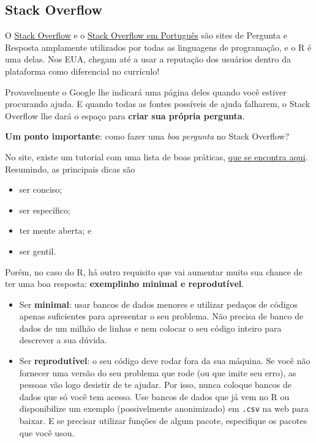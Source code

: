 \documentclass[
]{book}
\providecommand{\tightlist}{%
  \setlength{\itemsep}{0pt}\setlength{\parskip}{0pt}}
\begin{document}
\hypertarget{stack-overflow}{%
\subsection{Stack Overflow}\label{stack-overflow}}

O \href{http://stackoverflow.com/}{Stack Overflow} e o \href{http://pt.stackoverflow.com/}{Stack Overflow em Português} são sites de Pergunta e Resposta amplamente utilizados por todas as linguagens de programação, e o R é uma delas. Nos EUA, chegam até a usar a reputação dos usuários dentro da plataforma como diferencial no currículo!

Provavelmente o Google lhe indicará uma página deles quando você estiver procurando ajuda. E quando todas as fontes possíveis de ajuda falharem, o Stack Overflow lhe dará o espaço para \textbf{criar sua própria pergunta}.

\textbf{Um ponto importante}: como fazer uma \emph{boa pergunta} no Stack Overflow?

No site, existe um tutorial com uma lista de boas práticas, \href{http://pt.stackoverflow.com/help/how-to-ask}{que se encontra aqui}. Resumindo, as principais dicas são

\begin{itemize}
\tightlist
\item
  ser conciso;
\item
  ser específico;
\item
  ter mente aberta; e
\item
  ser gentil.
\end{itemize}

Porém, no caso do R, há outro requisito que vai aumentar muito sua chance de ter uma boa resposta: \textbf{exemplinho minimal e reprodutível}.

\begin{itemize}
\item
  Ser \textbf{minimal}: usar bancos de dados menores e utilizar pedaços de códigos apenas suficientes para apresentar o seu problema. Não precisa de banco de dados de um milhão de linhas e nem colocar o seu código inteiro para descrever a sua dúvida.
\item
  Ser \textbf{reprodutível}: o seu código deve rodar fora da sua máquina. Se você não fornecer uma versão do seu problema que rode (ou que imite seu erro), as pessoas vão logo desistir de te ajudar. Por isso, nunca coloque bancos de dados que só você tem acesso. Use bancos de dados que já vem no R ou disponibilize um exemplo (possivelmente anonimizado) em \texttt{.csv} na web para baixar. E se precisar utilizar funções de algum pacote, especifique os pacotes que você usou.
\end{itemize}
\end{document}
